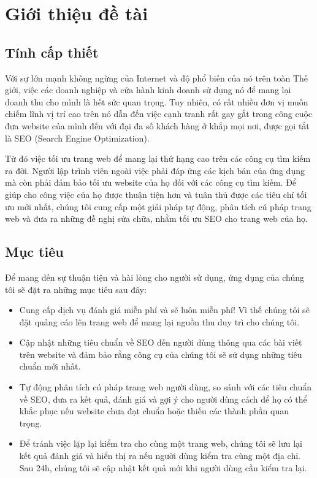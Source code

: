 \chapter{Giới thiệu đề tài}
\section{Tính cấp thiết}
Với sự lớn mạnh không ngừng của Internet và độ phổ biến của nó trên toàn Thế giới, việc các doanh nghiệp và cửa hành kinh doanh sử dụng nó để mang lại doanh thu cho mình là hết sức quan trọng. Tuy nhiên, có rất nhiều đơn vị muốn chiếm lĩnh vị trí cao trên nó dẫn đến việc cạnh tranh rất gay gắt trong công cuộc đưa website của mình đến với đại đa số khách hàng ở khắp mọi nơi, được gọi tắt là SEO (Search Engine Optimization).
\par
Từ đó việc tối ưu trang web để mang lại thứ hạng cao trên các công cụ tìm kiếm ra đời. Người lập trình viên ngoài việc phải đáp ứng các kịch bản của ứng dụng mà còn phải đảm bảo tối ưu website của họ đối với các công cụ tìm kiếm. Để giúp cho công việc của họ được thuận tiện hơn và tuân thủ được các tiêu chí tối ưu mới nhất, chúng tôi cung cấp một giải pháp tự động, phân tích cú pháp trang web và đưa ra những đề nghị sửa chữa, nhằm tối ưu SEO cho trang web của họ.
\section{Mục tiêu}
Để mang đến sự thuận tiện và hài lòng cho người sử dụng, ứng dụng của chúng tôi sẽ đặt ra những mục tiêu sau đây:
\begin{itemize}
	\item Cung cấp dịch vụ đánh giá miễn phí và sẽ luôn miễn phí! Vì thế chúng tôi sẽ đặt quảng cáo lên trang web để mang lại nguồn thu duy trì cho chúng tôi.
	\item Cập nhật những tiêu chuẩn về SEO đến người dùng thông qua các bài viết trên website và đảm bảo rằng công cụ của chúng tôi sẽ sử dụng những tiêu chuẩn mới nhất.
	\item Tự động phân tích cú pháp trang web người dùng, so sánh với các tiêu chuẩn về SEO, đưa ra kết quả, đánh giá và gợi ý cho người dùng cách để họ có thể khắc phục nếu website chưa đạt chuẩn hoặc thiếu các thành phần quan trọng.
	\item Để tránh việc lặp lại kiểm tra cho cùng một trang web, chúng tôi sẽ lưu lại kết quả đánh giá và hiển thị ra nếu người dùng kiểm tra cùng một địa chỉ. Sau 24h, chúng tôi sẽ cập nhật kết quả mới khi người dùng cần kiểm tra lại.
\end{itemize}
